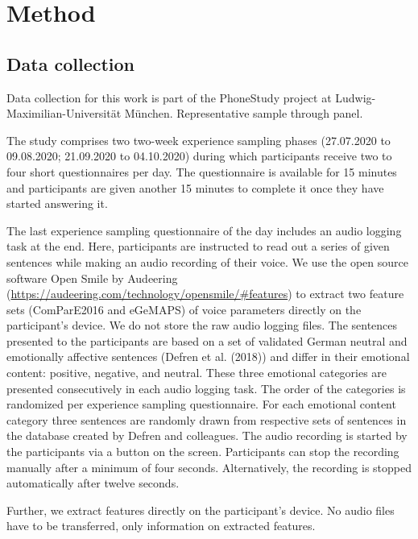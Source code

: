\documentclass[english,man]{apa6}
\begin{document}
\hypertarget{method}{%
\section{Method}\label{method}}

\hypertarget{data-collection}{%
\subsection{Data collection}\label{data-collection}}

Data collection for this work is part of the PhoneStudy project at Ludwig-Maximilian-Universität München. Representative sample through panel.

The study comprises two two-week experience sampling phases (27.07.2020 to 09.08.2020; 21.09.2020 to 04.10.2020) during which participants receive two to four short questionnaires per day. The
questionnaire is available for 15 minutes and participants are given another 15 minutes to
complete it once they have started answering it.

The last experience sampling questionnaire of the day includes an audio logging task at the
end. Here, participants are instructed to read out a series of given sentences while making an
audio recording of their voice. We use the open source software Open Smile by Audeering
(\url{https://audeering.com/technology/opensmile/\#features}) to extract two feature sets
(ComParE2016 and eGeMAPS) of voice parameters directly on the participant's device. We do
not store the raw audio logging files. The sentences presented to the participants are based on
a set of validated German neutral and emotionally affective sentences (Defren et al. (2018)) and
differ in their emotional content: positive, negative, and neutral. These three emotional
categories are presented consecutively in each audio logging task. The order of the categories
is randomized per experience sampling questionnaire. For each emotional content category
three sentences are randomly drawn from respective sets of sentences in the database created
by Defren and colleagues. The audio recording is started by the participants via a button on the
screen. Participants can stop the recording manually after a minimum of four seconds.
Alternatively, the recording is stopped automatically after twelve seconds.

Further, we extract features directly on the participant's device. No audio files have to be transferred, only information on extracted features.
\end{document}
